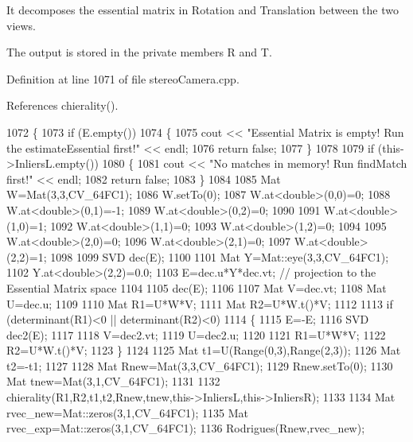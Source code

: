 It decomposes the essential matrix in Rotation and Translation between the two views. 

The output is stored in the private members R and T. 

Definition at line 1071 of file stereo\+Camera.\+cpp.



References chierality().


\begin{DoxyCode}
1072 \{
1073     \textcolor{keywordflow}{if} (E.empty())
1074     \{
1075         cout << \textcolor{stringliteral}{"Essential Matrix is empty! Run the estimateEssential first!"} << endl;
1076         \textcolor{keywordflow}{return} \textcolor{keyword}{false};
1077     \}
1078 
1079     \textcolor{keywordflow}{if} (this->InliersL.empty())
1080     \{
1081         cout << \textcolor{stringliteral}{"No matches in memory! Run findMatch first!"} << endl;
1082         \textcolor{keywordflow}{return} \textcolor{keyword}{false};
1083     \}
1084 
1085     Mat W=Mat(3,3,CV\_64FC1);
1086     W.setTo(0);
1087     W.at<\textcolor{keywordtype}{double}>(0,0)=0;
1088     W.at<\textcolor{keywordtype}{double}>(0,1)=-1;
1089     W.at<\textcolor{keywordtype}{double}>(0,2)=0;
1090 
1091     W.at<\textcolor{keywordtype}{double}>(1,0)=1;
1092     W.at<\textcolor{keywordtype}{double}>(1,1)=0;
1093     W.at<\textcolor{keywordtype}{double}>(1,2)=0;
1094 
1095     W.at<\textcolor{keywordtype}{double}>(2,0)=0;
1096     W.at<\textcolor{keywordtype}{double}>(2,1)=0;
1097     W.at<\textcolor{keywordtype}{double}>(2,2)=1;
1098 
1099     SVD dec(E);
1100 
1101     Mat Y=Mat::eye(3,3,CV\_64FC1);
1102     Y.at<\textcolor{keywordtype}{double}>(2,2)=0.0;
1103     E=dec.u*Y*dec.vt; \textcolor{comment}{// projection to the Essential Matrix space}
1104 
1105     dec(E);
1106 
1107     Mat V=dec.vt;
1108     Mat U=dec.u;
1109 
1110     Mat R1=U*W*V;
1111     Mat R2=U*W.t()*V;
1112 
1113     \textcolor{keywordflow}{if} (determinant(R1)<0 || determinant(R2)<0)
1114     \{
1115         E=-E;
1116         SVD dec2(E);
1117 
1118         V=dec2.vt;
1119         U=dec2.u;
1120 
1121         R1=U*W*V;
1122         R2=U*W.t()*V;
1123     \}
1124 
1125     Mat t1=U(Range(0,3),Range(2,3));
1126     Mat t2=-t1;
1127 
1128     Mat Rnew=Mat(3,3,CV\_64FC1);
1129     Rnew.setTo(0);
1130     Mat tnew=Mat(3,1,CV\_64FC1);
1131 
1132     chierality(R1,R2,t1,t2,Rnew,tnew,this->InliersL,this->InliersR);
1133 
1134     Mat rvec\_new=Mat::zeros(3,1,CV\_64FC1);
1135     Mat rvec\_exp=Mat::zeros(3,1,CV\_64FC1);
1136     Rodrigues(Rnew,rvec\_new);

\end{DoxyCode}
